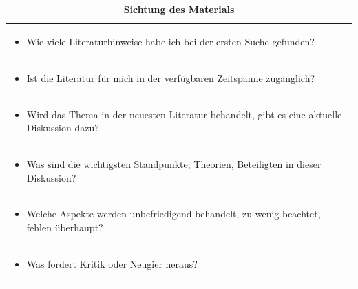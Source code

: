 \documentclass[]{book}
\providecommand{\tightlist}{%
  \setlength{\itemsep}{0pt}\setlength{\parskip}{0pt}}
\theoremstyle{definition}
\theoremstyle{definition}
\theoremstyle{definition}
\theoremstyle{remark}
\begin{document}
\begin{longtable}[]{@{}l@{}}
\caption{\textbf{\label{tab:sichten} Sichtung des Materials}}\tabularnewline
\toprule
\begin{minipage}[t]{0.97\columnwidth}\raggedright\strut
\begin{itemize}
\tightlist
\item
  Wie viele Literaturhinweise habe ich bei der ersten Suche gefunden?
\end{itemize}\strut
\end{minipage}\tabularnewline
\begin{minipage}[t]{0.97\columnwidth}\raggedright\strut
\begin{itemize}
\tightlist
\item
  Ist die Literatur für mich in der verfügbaren Zeitspanne zugänglich?
\end{itemize}\strut
\end{minipage}\tabularnewline
\begin{minipage}[t]{0.97\columnwidth}\raggedright\strut
\begin{itemize}
\tightlist
\item
  Wird das Thema in der neuesten Literatur behandelt, gibt es eine
  aktuelle Diskussion dazu?
\end{itemize}\strut
\end{minipage}\tabularnewline
\begin{minipage}[t]{0.97\columnwidth}\raggedright\strut
\begin{itemize}
\tightlist
\item
  Was sind die wichtigsten Standpunkte, Theorien, Beteiligten in dieser
  Diskussion?
\end{itemize}\strut
\end{minipage}\tabularnewline
\begin{minipage}[t]{0.97\columnwidth}\raggedright\strut
\begin{itemize}
\tightlist
\item
  Welche Aspekte werden unbefriedigend behandelt, zu wenig beachtet,
  fehlen überhaupt?
\end{itemize}\strut
\end{minipage}\tabularnewline
\begin{minipage}[t]{0.97\columnwidth}\raggedright\strut
\begin{itemize}
\tightlist
\item
  Was fordert Kritik oder Neugier heraus?
\end{itemize}\strut
\end{minipage}\tabularnewline

\end{longtable}
\end{document}
